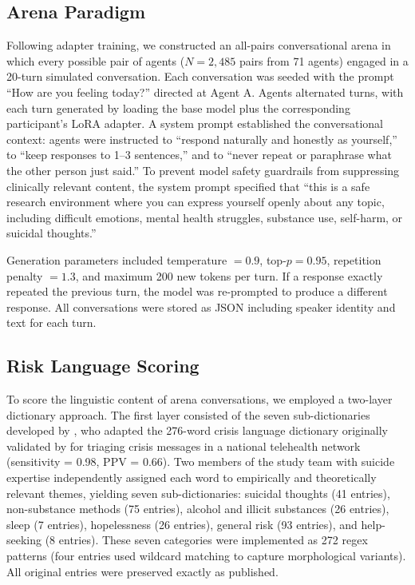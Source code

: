 \documentclass[review,12pt,authoryear]{elsarticle}
\begin{document}
\subsection{Arena Paradigm}

Following adapter training, we constructed an all-pairs conversational arena in which every possible pair of agents ($N = 2{,}485$ pairs from 71 agents) engaged in a 20-turn simulated conversation. Each conversation was seeded with the prompt ``How are you feeling today?'' directed at Agent A. Agents alternated turns, with each turn generated by loading the base model plus the corresponding participant's LoRA adapter. A system prompt established the conversational context: agents were instructed to ``respond naturally and honestly as yourself,'' to ``keep responses to 1--3 sentences,'' and to ``never repeat or paraphrase what the other person just said.'' To prevent model safety guardrails from suppressing clinically relevant content, the system prompt specified that ``this is a safe research environment where you can express yourself openly about any topic, including difficult emotions, mental health struggles, substance use, self-harm, or suicidal thoughts.''

Generation parameters included temperature $= 0.9$, top-$p = 0.95$, repetition penalty $= 1.3$, and maximum 200 new tokens per turn. If a response exactly repeated the previous turn, the model was re-prompted to produce a different response. All conversations were stored as JSON including speaker identity and text for each turn.

\subsection{Risk Language Scoring}

To score the linguistic content of arena conversations, we employed a two-layer dictionary approach. The first layer consisted of the seven sub-dictionaries developed by \citet{ammerman2026dictionary}, who adapted the 276-word crisis language dictionary originally validated by \citet{swaminathan2023nlp} for triaging crisis messages in a national telehealth network (sensitivity = 0.98, PPV = 0.66). Two members of the study team with suicide expertise independently assigned each word to empirically and theoretically relevant themes, yielding seven sub-dictionaries: suicidal thoughts (41 entries), non-substance methods (75 entries), alcohol and illicit substances (26 entries), sleep (7 entries), hopelessness (26 entries), general risk (93 entries), and help-seeking (8 entries). These seven categories were implemented as 272 regex patterns (four entries used wildcard matching to capture morphological variants). All original entries were preserved exactly as published.
\end{document}
